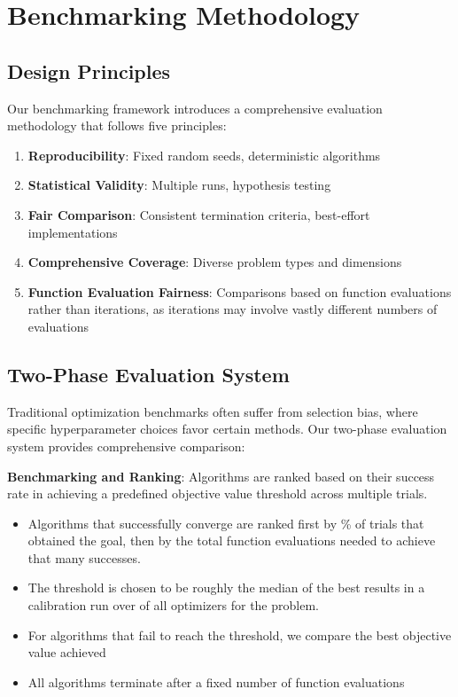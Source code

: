\hypertarget{benchmarking-methodology}{%
\section{Benchmarking Methodology}\label{benchmarking-methodology}}

\hypertarget{design-principles}{%
\subsection{Design Principles}\label{design-principles}}

Our benchmarking framework introduces a comprehensive evaluation methodology that follows five principles:

\begin{enumerate}
\def\labelenumi{\arabic{enumi}.}
\tightlist
\item
  \textbf{Reproducibility}: Fixed random seeds, deterministic algorithms
\item
  \textbf{Statistical Validity}: Multiple runs, hypothesis testing
\item
  \textbf{Fair Comparison}: Consistent termination criteria, best-effort implementations
\item
  \textbf{Comprehensive Coverage}: Diverse problem types and dimensions
\item
  \textbf{Function Evaluation Fairness}: Comparisons based on function evaluations rather than iterations, as iterations may involve vastly different numbers of evaluations
\end{enumerate}

\hypertarget{two-phase-evaluation-system}{%
\subsection{Two-Phase Evaluation System}\label{two-phase-evaluation-system}}

Traditional optimization benchmarks often suffer from selection bias, where specific hyperparameter choices favor certain methods. Our two-phase evaluation system provides comprehensive comparison:

\textbf{Benchmarking and Ranking}: Algorithms are ranked based on their success rate in achieving a predefined objective value threshold across multiple trials.

\begin{itemize}
\tightlist
\item
  Algorithms that successfully converge are ranked first by \% of trials that obtained the goal, then by the total function evaluations needed to achieve that many successes.
\item
  The threshold is chosen to be roughly the median of the best results in a calibration run over of all optimizers for the problem.
\item
  For algorithms that fail to reach the threshold, we compare the best objective value achieved
\item
  All algorithms terminate after a fixed number of function evaluations
\end{itemize}

